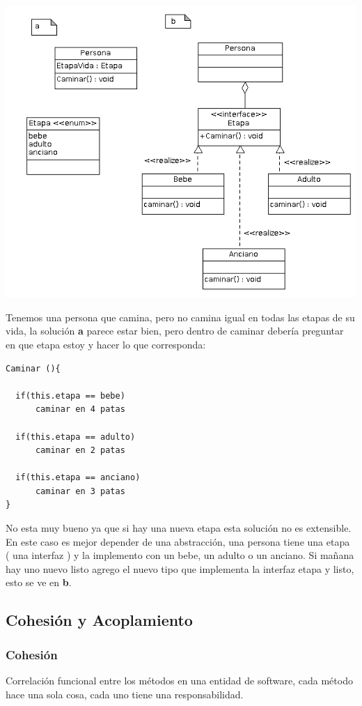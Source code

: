 \documentclass[10pt,a4paper]{article}
\begin{document}
\includegraphics[scale=0.5]{./img/persona.png} 

Tenemos una persona que camina, pero no camina igual en todas las etapas de su vida,
la solución \textbf{a} parece estar bien, 
pero dentro de caminar debería preguntar en que etapa estoy 
y hacer lo que corresponda:
\begin{verbatim}
Caminar (){

  if(this.etapa == bebe)
      caminar en 4 patas

  if(this.etapa == adulto)
      caminar en 2 patas

  if(this.etapa == anciano)
      caminar en 3 patas
}
\end{verbatim}

No esta muy bueno ya que si hay una nueva etapa esta solución
no es extensible. 
En este caso es mejor depender de una abstracción, una persona tiene
una etapa ( una interfaz ) y la implemento con
un bebe, un adulto o un anciano. Si mañana hay uno nuevo
listo agrego el nuevo tipo que implementa la interfaz etapa y listo, esto se ve en \textbf{b}.


\subsection{Cohesión y Acoplamiento}

\subsubsection{Cohesión}
Correlación funcional entre los métodos en una entidad de software,
cada método hace una sola cosa, cada uno tiene una responsabilidad.
\end{document}
